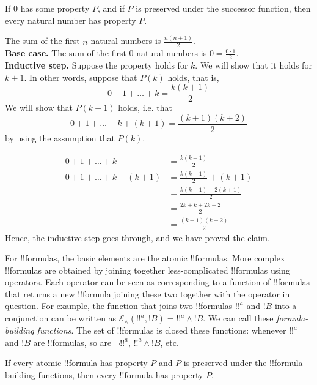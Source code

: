 \documentclass[../../include/open-logic-section]{subfiles}
\begin{document}
\begin{defn}
If 0 has some property $P$, and if $P$ is preserved under the
successor function, then every natural number has property $P$.
\end{defn}

\begin{ex} The sum of the first $n$ natural numbers is $\frac{n(n+1)}{2}$. \\

\textbf{Base case.} The sum of the first 0 natural numbers is $0=
\frac{0\cdot 1}{2}$.\\

\textbf{Inductive step.} Suppose the property holds for $k$. We will
show that it holds for $k+1$. In other words, suppose that $P(k)$
holds, that is,
\[ 0 + 1 + \ldots + k = \frac{k(k+1)}{2} \]
We will show that $P(k+1)$ holds, i.e. that
\[ 0 + 1 + \ldots + k + (k+1) = \frac{(k+1)(k+2)}{2} \]
by using the assumption that $P(k)$.

\begin{align*}
0 + 1 + \ldots + k &= \frac{k(k+1)}{2} \tag{Assumption} \\
0 + 1 + \ldots + k + (k+1) &= \frac{k(k+1)}{2} + (k+1) 
\tag{Add $k+1$ to both sides} \\
&= \frac{k(k+1) + 2(k+1)}{2} \\
&= \frac{2k + k + 2k +2}{2} \\
&=\frac{(k+1)(k+2)}{2}
\end{align*}
Hence, the inductive step goes through, and we have proved the claim.
\end{ex}

\begin{explain}
For !!{formula}s, the basic elements are the atomic !!{formula}s. More
complex !!{formula}s are obtained by joining together less-complicated
!!{formula}s using operators. Each operator can be seen as
corresponding to a function of !!{formula}s that returns a new
!!{formula} joining these two together with the operator in
question. For example, the function that joins two !!{formula}s $!!^a$
and $!B$ into a conjunction can be written as $\mathcal E _\land (!!^a,
!B) = !!^a \land !B$. We can call these \emph{formula-building
  functions}. The set of !!{formula}s is closed these functions:
whenever $!!^a$ and $!B$ are !!{formula}s, so are $\lnot !!^a$, $!!^a \land
!B$, etc.
\end{explain}

\begin{defn}
If every atomic !!{formula} has property $P$ and $P$ is preserved
under the !!{formula}-building functions, then every !!{formula} has
property $P$.
\end{defn}
\end{document}
